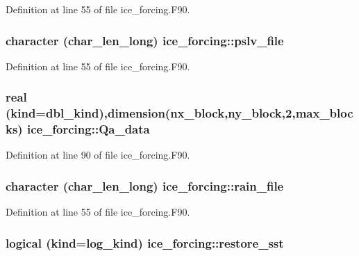 Definition at line 55 of file ice\_\-forcing.F90.\hypertarget{namespaceice__forcing_a6aaf5d68f7a6e2eca9949390469c09eb}{
\subsubsection[{pslv\_\-file}]{\setlength{\rightskip}{0pt plus 5cm}character (char\_\-len\_\-long) {\bf ice\_\-forcing::pslv\_\-file}}}
\label{namespaceice__forcing_a6aaf5d68f7a6e2eca9949390469c09eb}


Definition at line 55 of file ice\_\-forcing.F90.\hypertarget{namespaceice__forcing_aa702ee11143b22380ab015e34da2cd55}{
\subsubsection[{Qa\_\-data}]{\setlength{\rightskip}{0pt plus 5cm}real (kind=dbl\_\-kind),dimension(nx\_\-block,ny\_\-block,2,max\_\-blocks) {\bf ice\_\-forcing::Qa\_\-data}}}
\label{namespaceice__forcing_aa702ee11143b22380ab015e34da2cd55}


Definition at line 90 of file ice\_\-forcing.F90.\hypertarget{namespaceice__forcing_a872adfb9cc20037a1b0dc19f317438bd}{
\subsubsection[{rain\_\-file}]{\setlength{\rightskip}{0pt plus 5cm}character (char\_\-len\_\-long) {\bf ice\_\-forcing::rain\_\-file}}}
\label{namespaceice__forcing_a872adfb9cc20037a1b0dc19f317438bd}


Definition at line 55 of file ice\_\-forcing.F90.\hypertarget{namespaceice__forcing_a08581fb1de6afa9fa693b22a508447ff}{
\subsubsection[{restore\_\-sst}]{\setlength{\rightskip}{0pt plus 5cm}logical (kind=log\_\-kind) {\bf ice\_\-forcing::restore\_\-sst}}}
\label{namespaceice__forcing_a08581fb1de6afa9fa693b22a508447ff}


